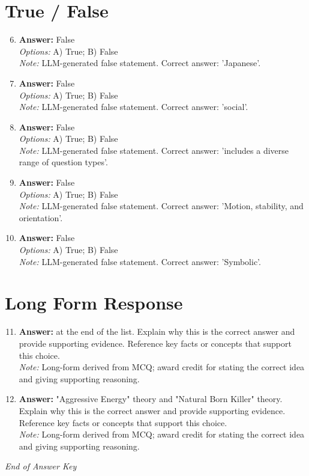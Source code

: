 \documentclass[12pt]{article}
\begin{document}
\section*{True / False}
\begin{enumerate}[label=\arabic*.]
\setcounter{enumi}{5}
\item \textbf{Answer:} False
\\ \textit{Options:} A) True; B) False
\\ \textit{Note:} LLM-generated false statement. Correct answer: 'Japanese'.
\item \textbf{Answer:} False
\\ \textit{Options:} A) True; B) False
\\ \textit{Note:} LLM-generated false statement. Correct answer: 'social'.
\item \textbf{Answer:} False
\\ \textit{Options:} A) True; B) False
\\ \textit{Note:} LLM-generated false statement. Correct answer: 'includes a diverse range of question types'.
\item \textbf{Answer:} False
\\ \textit{Options:} A) True; B) False
\\ \textit{Note:} LLM-generated false statement. Correct answer: 'Motion, stability, and orientation'.
\item \textbf{Answer:} False
\\ \textit{Options:} A) True; B) False
\\ \textit{Note:} LLM-generated false statement. Correct answer: 'Symbolic'.
\end{enumerate}

\section*{Long Form Response}
\begin{enumerate}[label=\arabic*.]
\setcounter{enumi}{10}
\item \textbf{Answer:} at the end of the list. Explain why this is the correct answer and provide supporting evidence. Reference key facts or concepts that support this choice.
\\ \textit{Note:} Long-form derived from MCQ; award credit for stating the correct idea and giving supporting reasoning.
\item \textbf{Answer:} "Aggressive Energy" theory and "Natural Born Killer" theory. Explain why this is the correct answer and provide supporting evidence. Reference key facts or concepts that support this choice.
\\ \textit{Note:} Long-form derived from MCQ; award credit for stating the correct idea and giving supporting reasoning.
\end{enumerate}

\vfill
\noindent\textit{End of Answer Key}
\end{document}
